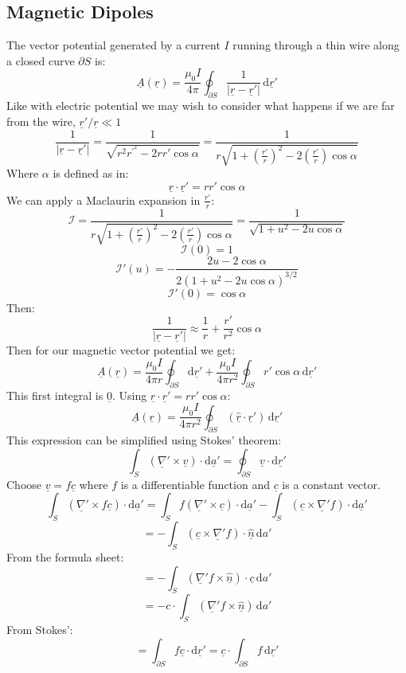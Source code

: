 \documentclass[12pt]{article}
\begin{document}
\subsection{Magnetic Dipoles}
The vector potential generated by a current \(I\) running through a thin wire along a closed curve \(\partial S\) is:
\[\underline{A}(\underline{r})=\frac{\mu_0I}{4\pi}\oint_{\partial S}\frac{1}{|\underline{r}-\underline{r}'|}\,\text{d}\underline{r}'\]
Like with electric potential we may wish to consider what happens if we are far from the wire, \(\underline{r}'/\underline{r}\ll1\)
\[\frac{1}{|\underline{r}-\underline{r}'|}=\frac{1}{\sqrt{r^2 r^{'^2}-2rr'\cos\alpha}}=\frac{1}{r\sqrt{1+\left(\frac{r'}{r}\right)^2-2\left(\frac{r'}{r}\right)\cos\alpha}}\]
Where \(\alpha\) is defined as in:
\[\underline{r}\cdot\underline{r}'=rr'\cos\alpha\]
We can apply a Maclaurin expansion in \(\frac{r'}{r}\):
\[\mathcal{I}=\frac{1}{r\sqrt{1+\left(\frac{r'}{r}\right)^2-2\left(\frac{r'}{r}\right)\cos\alpha}}=\frac{1}{\sqrt{1+u^2-2u\cos\alpha}}\]
\[\mathcal{I}(0)=1\]
\[\mathcal{I}'(u)=-\frac{2u-2\cos\alpha}{2(1+u^2-2u\cos\alpha)^{3/2}}\]
\[\mathcal{I}'(0)=\cos\alpha\]
Then:
\[\frac{1}{|\underline{r}-\underline{r}'|}\approx\frac{1}{r}+\frac{r'}{r^2}\cos\alpha\]
Then for our magnetic vector potential we get:
\[\underline{A}(\underline{r})=\frac{\mu_0I}{4\pi r}\oint_{\partial S}\text{d}\underline{r}'+\frac{\mu_0I}{4\pi r^2}\oint_{\partial S}r'\cos\alpha\,\text{d}\underline{r}'\]
This first integral is \(\underline{0}\). Using \(\underline{r}\cdot\underline{r}'=rr'\cos\alpha\):
\[\underline{A}(\underline{r})=\frac{\mu_0I}{4\pi r^2}\oint_{\partial S}(\underline{\hat{r}}\cdot\underline{r}')\,\text{d}\underline{r}'\]
This expression can be simplified using Stokes' theorem:
\[\int_S(\underline{\nabla}'\times \underline{v})\cdot\text{d}\underline{a}'=\oint_{\partial S}\underline{v}\cdot\text{d}\underline{r}'\]
Choose \(\underline{v}=f\underline{c}\) where \(f\) is a differentiable function and \(\underline{c}\) is a constant vector.
\[\int_S(\underline{\nabla}'\times f\underline{c})\cdot\text{d}\underline{a}'=\int_Sf(\underline{\nabla}'\times \underline{c})\cdot\text{d}\underline{a}'-\int_S(\underline{c}\times\underline{\nabla}'f)\cdot\text{d}\underline{a}'\]
\[=-\int_S(\underline{c}\times\underline{\nabla}'f)\cdot\underline{\hat{n}}\,\text{d}a'\]
From the formula sheet:
\[=-\int_S(\underline{\nabla}'f\times \underline{\hat{n}})\cdot \underline{c}\,\text{d}a'\]
\[=-c\cdot\int_S(\underline{\nabla}'f\times\underline{\hat{n}})\,\text{d}a' \]
From Stokes':
\[=\int_{\partial S}f\underline{c}\cdot\text{d}\underline{r}'=\underline{c}\cdot\int_{\partial S}f\,\text{d}\underline{r}'\]
\end{document}

